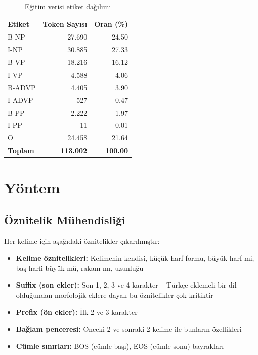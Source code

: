 \documentclass[12pt,a4paper]{article}
\begin{document}
\begin{table}[H]
\centering
\caption{Eğitim verisi etiket dağılımı}
\begin{tabular}{lrr}
\toprule
\textbf{Etiket} & \textbf{Token Sayısı} & \textbf{Oran (\%)} \\
\midrule
B-NP   & 27.690 & 24.50 \\
I-NP   & 30.885 & 27.33 \\
B-VP   & 18.216 & 16.12 \\
I-VP   &  4.588 &  4.06 \\
B-ADVP &  4.405 &  3.90 \\
I-ADVP &    527 &  0.47 \\
B-PP   &  2.222 &  1.97 \\
I-PP   &     11 &  0.01 \\
O      & 24.458 & 21.64 \\
\midrule
\textbf{Toplam} & \textbf{113.002} & \textbf{100.00} \\
\bottomrule
\end{tabular}
\end{table}

\section{Yöntem}

\subsection{Öznitelik Mühendisliği}

Her kelime için aşağıdaki öznitelikler çıkarılmıştır:

\begin{itemize}
    \item \textbf{Kelime öznitelikleri:} Kelimenin kendisi, küçük harf formu, büyük harf mi, baş harfi büyük mü, rakam mı, uzunluğu
    \item \textbf{Suffix (son ekler):} Son 1, 2, 3 ve 4 karakter -- Türkçe eklemeli bir dil olduğundan morfolojik eklere dayalı bu öznitelikler çok kritiktir
    \item \textbf{Prefix (ön ekler):} İlk 2 ve 3 karakter
    \item \textbf{Bağlam penceresi:} Önceki 2 ve sonraki 2 kelime ile bunların özellikleri
    \item \textbf{Cümle sınırları:} BOS (cümle başı), EOS (cümle sonu) bayrakları
\end{itemize}
\end{document}
